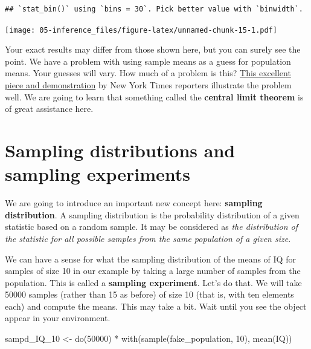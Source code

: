 \documentclass[
]{book}
\newenvironment{Shaded}{\begin{snugshade}}{\end{snugshade}}
\newcommand{\DecValTok}[1]{\textcolor[rgb]{0.00,0.00,0.81}{#1}}
\newcommand{\FunctionTok}[1]{\textcolor[rgb]{0.00,0.00,0.00}{#1}}
\newcommand{\NormalTok}[1]{#1}
\newcommand{\OtherTok}[1]{\textcolor[rgb]{0.56,0.35,0.01}{#1}}
\newcommand{\SpecialCharTok}[1]{\textcolor[rgb]{0.00,0.00,0.00}{#1}}
\begin{document}
\begin{verbatim}
## `stat_bin()` using `bins = 30`. Pick better value with `binwidth`.
\end{verbatim}

\texttt{[image: 05-inference\_files/figure-latex/unnamed-chunk-15-1.pdf]}

Your exact results may differ from those shown here, but you can surely see the point. We have a problem with using sample means as a guess for population means. Your guesses will vary. How much of a problem is this? \href{http://www.nytimes.com/2014/05/02/upshot/how-not-to-be-misled-by-the-jobs-report.html?_r=0}{This excellent piece and demonstration} by New York Times reporters illustrate the problem well. We are going to learn that something called the \textbf{central limit theorem} is of great assistance here.

\hypertarget{sampling-distributions-and-sampling-experiments}{%
\section{Sampling distributions and sampling experiments}\label{sampling-distributions-and-sampling-experiments}}

We are going to introduce an important new concept here: \textbf{sampling distribution}. A sampling distribution is the probability distribution of a given statistic based on a random sample. It may be considered as \emph{the distribution of the statistic for all possible samples from the same population of a given size}.

We can have a sense for what the sampling distribution of the means of IQ for samples of size 10 in our example by taking a large number of samples from the population. This is called a \textbf{sampling experiment}. Let's do that. We will take 50000 samples (rather than 15 as before) of size 10 (that is, with ten elements each) and compute the means. This may take a bit. Wait until you see the object appear in your environment.

\begin{Shaded}
\begin{Highlighting}[]
\NormalTok{sampd\_IQ\_10 }\OtherTok{\textless{}{-}} \FunctionTok{do}\NormalTok{(}\DecValTok{50000}\NormalTok{) }\SpecialCharTok{*} \FunctionTok{with}\NormalTok{(}\FunctionTok{sample}\NormalTok{(fake\_population, }\DecValTok{10}\NormalTok{), }\FunctionTok{mean}\NormalTok{(IQ))}
\end{Highlighting}
\end{Shaded}
\end{document}
